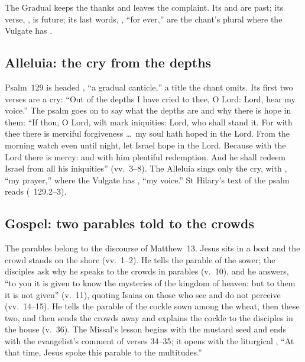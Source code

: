 The Gradual keeps the thanks and leaves the complaint. Its  and  are past; its verse, , is future; its last words, , ``for ever,'' are the
chant's plural where the Vulgate has .

\subsection{Alleluia: the cry from the depths}
\label{sec:element-alleluia}

Psalm~129 is headed , ``a gradual canticle,'' a title
the chant omits. Its first two verses are a cry: ``Out of the depths I have cried to thee, O Lord: Lord, hear my voice.''
The psalm goes on to say what the depths are and why there is hope in them:
``If thou, O Lord, wilt mark iniquities: Lord, who shall stand it. For with
thee there is merciful forgiveness \dots\ my soul hath hoped in the Lord. From
the morning watch even until night, let Israel hope in the Lord. Because with
the Lord there is mercy: and with him plentiful redemption. And he shall
redeem Israel from all his iniquities'' (vv.~3--8). The Alleluia sings only
the cry, with , ``my prayer,'' where the Vulgate has
, ``my voice.'' St Hilary's text of the psalm reads
 (~129.2--3).

\subsection{Gospel: two parables told to the crowds}
\label{sec:element-gospel}

The parables belong to the discourse of Matthew~13. Jesus sits in a boat and
the crowd stands on the shore (vv.~1--2). He tells the parable of the sower;
the disciples ask why he speaks to the crowds in parables (v.~10), and he
answers, ``to you it is given to know the mysteries of the kingdom of heaven:
but to them it is not given'' (v.~11), quoting Isaias on those who see and do
not perceive (vv.~14--15). He tells the parable of the cockle sown among the wheat, then
these two, and then sends the crowds away and explains the cockle to the
disciples in the house (v.~36). The Missal's lesson begins with the mustard
seed and ends with the evangelist's comment of verses 34--35; it opens with
the liturgical , ``At
that time, Jesus spoke this parable to the multitudes.''


